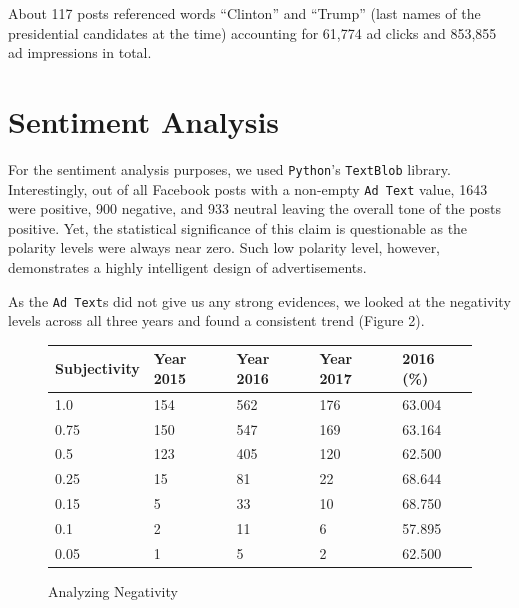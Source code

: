 \documentclass[12pt]{article}
\theoremstyle{definition}
\begin{document}
\bigskip

About 117 posts referenced words ``Clinton'' and ``Trump'' (last names of the
presidential candidates at the time) accounting for 61,774 ad clicks and
853,855 ad impressions in total.


\section*{\centering Sentiment Analysis}

For the sentiment analysis purposes, we used \texttt{Python}'s
\texttt{TextBlob} library. Interestingly, out of all Facebook posts with a
non-empty \texttt{Ad Text} value, 1643 were positive, 900 negative, and 933
neutral leaving the overall tone of the posts positive. Yet, the statistical
significance of this claim is questionable as the polarity levels were always
near zero. Such low polarity level, however, demonstrates a highly intelligent
design of advertisements.

\bigskip

As the \texttt{Ad Text}s did not give us any strong evidences, we looked at the
negativity levels across all three years and found a consistent trend (Figure 2).

\begin{figure}[H]
\centering
\begin{tabular}{|p{3cm}|p{3cm}|p{3cm}|p{3cm}|p{3cm}|}
 \hline
 Subjectivity & Year 2015 & Year 2016 & Year 2017 & 2016 (\%)\\
 \hline
 1.0  & 154 & 562 & 176 & 63.004\\
 \hline
 0.75 & 150 & 547 & 169 & 63.164\\
 \hline
 0.5  & 123 & 405 & 120 & 62.500\\
 \hline
 0.25 & 15  & 81  & 22  & 68.644\\
 \hline
 0.15 & 5   & 33  & 10  & 68.750\\
 \hline
 0.1  & 2   & 11  & 6   & 57.895\\
 \hline
 0.05 & 1   & 5   & 2   & 62.500\\
 \hline
\end{tabular}
\caption{Analyzing Negativity}
\end{figure}
\end{document}
